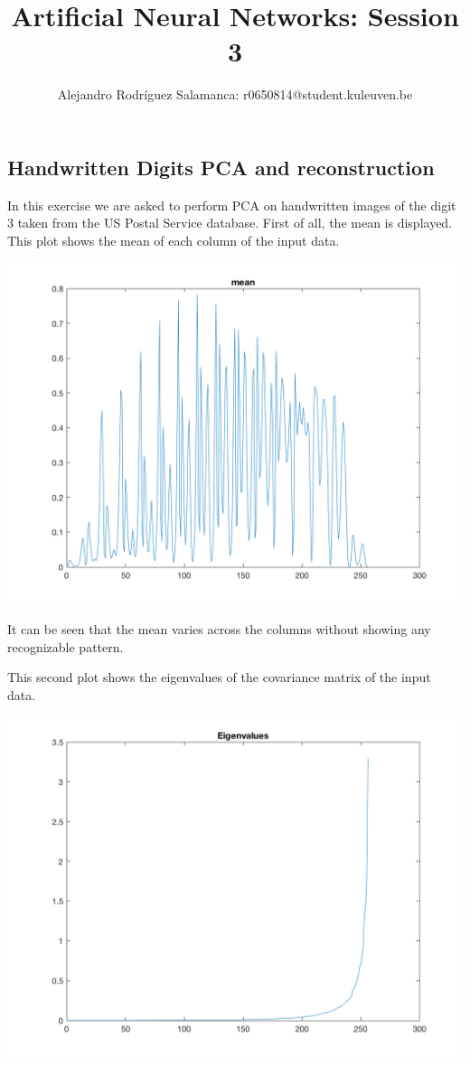 \documentclass[10pt]{article}
\author{Alejandro Rodríguez Salamanca: r0650814@student.kuleuven.be}
\date{}
\title{Artificial Neural Networks: Session 3}
\begin{document}
\maketitle

\begin{multicols}{2}
  \section*{Handwritten Digits PCA and reconstruction}
  In this exercise we are asked to perform PCA on handwritten images
  of the digit 3 taken from the US Postal Service database.
  First of all, the mean is displayed. This plot shows the mean of each column
  of the input data.

  \begin{center}
	\includegraphics[width=0.8\linewidth]{img/mean}
  \end{center}

  It can be seen that the mean varies across the columns without showing any
  recognizable pattern.

  This second plot shows the eigenvalues of the covariance matrix of the
  input data.

  \begin{center}
	\includegraphics[width=0.8\linewidth]{img/eig}
  \end{center}


\end{multicols}
\end{document}

